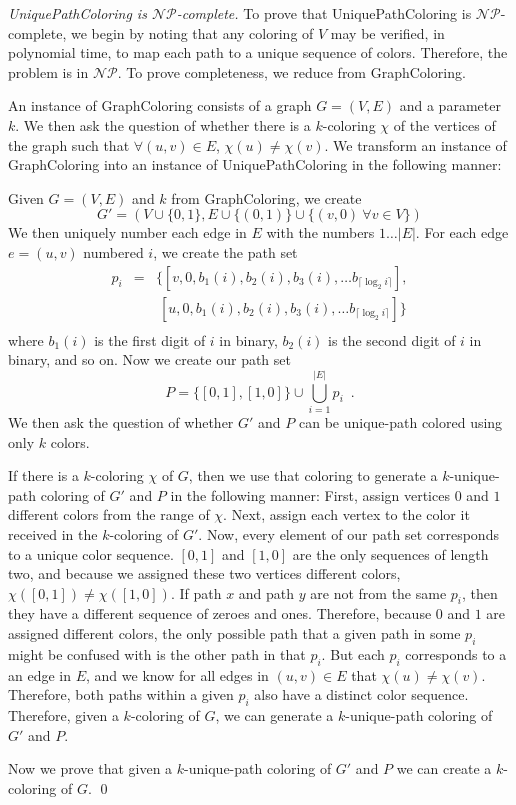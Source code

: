 \documentclass[runningheads]{llncs}
\newcommand{\NP}{\ensuremath{\mathcal{NP}}}
\begin{document}
\begin{proof}[{\sc UniquePathColoring} is \NP-complete]
To prove that {\sc UniquePathColoring} is \NP-complete, we begin by noting that any coloring of $V$ may be verified, in polynomial time, to map each path to a unique sequence of colors.  Therefore, the problem is in \NP.  To prove completeness, we reduce from {\sc GraphColoring}\cite{gandj}.

An instance of {\sc GraphColoring } consists of a graph $G=(V,E)$ and a parameter $k$.  We then ask the question of whether there is a $k$-coloring $\chi$ of the vertices of the graph such that $\forall (u,v)\in E$, $\chi(u) \neq \chi(v)$.  We transform an instance of {\sc GraphColoring} into an instance of {\sc UniquePathColoring} in the following manner:

Given $G=(V,E)$ and $k$ from {\sc GraphColoring}, we create 
$$G'=\left(V \cup \{0,1\}, E \cup \{(0,1)\} \cup \{ (v, 0)~ \forall v \in V\} \right)$$
We then uniquely number each edge in $E$ with the numbers $1 \ldots |E|$.  For each edge $e = (u,v)$ numbered $i$, we create the path set 
\begin{eqnarray*}
p_i &=& \{[v,0,b_1(i),b_2(i), b_3(i), \ldots b_{\lceil \log_2 i\rceil}], \\
    & &  ~[u, 0,b_1(i),b_2(i), b_3(i), \ldots b_{\lceil \log_2 i\rceil}]\} \\
\end{eqnarray*}
where $b_1(i)$ is the first digit of $i$ in binary, $b_2(i)$ is the second digit of $i$ in binary, and so on.  Now we create our path set 
$$P = \{ [0,1], [1,0] \} \cup \bigcup_{i = 1}^{|E|} p_i \enspace .$$
We then ask the question of whether $G'$ and $P$ can be unique-path colored using only $k$ colors.

If there is a $k$-coloring $\chi$ of $G$, then we use that coloring to generate
a $k$-unique-path coloring of $G'$ and $P$ in the following manner: First,
assign vertices $0$ and $1$ different colors from the range of $\chi$.  Next,
assign each vertex to the color it received in the $k$-coloring of $G'$.  Now,
every element of our path set corresponds to a unique color sequence.  $[0,1]$
and $[1,0]$ are the only sequences of length two, and because we assigned these
two vertices different colors, $\chi([0,1]) \neq \chi([1,0])$.  If path $x$ and
path $y$ are not from the same $p_i$, then they have a different sequence of
zeroes and ones.  Therefore, because $0$ and $1$ are assigned different colors,
the only possible path that a given path in some $p_i$ might be confused with
is the other path in that $p_i$.  But each $p_i$ corresponds to a an edge in
$E$, and we know for all edges in $(u,v) \in E$ that $\chi(u) \neq \chi(v)$.
Therefore, both paths within a given $p_i$ also have a distinct color sequence.  Therefore, given a $k$-coloring of $G$, we can generate a $k$-unique-path coloring of $G'$ and $P$.

Now we prove that given a $k$-unique-path coloring of $G'$ and $P$ we can create a $k$-coloring of $G$.
\qed
\end{proof}
\end{document}
